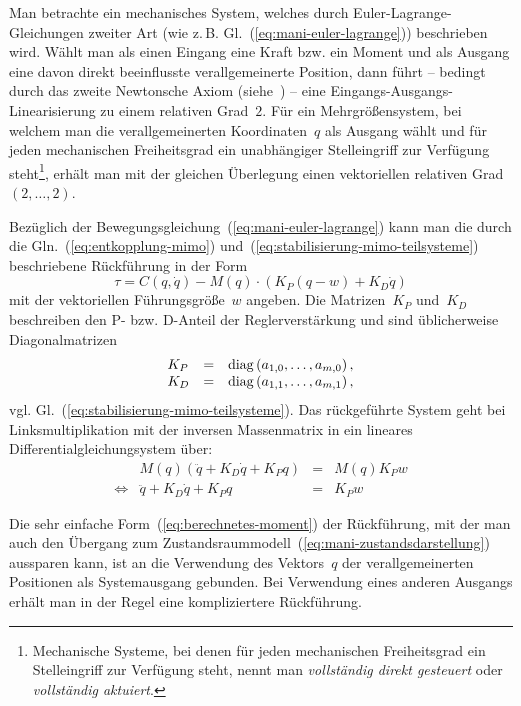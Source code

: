 \begin{remark}
\label{rem:Mechanisch-relativer-grad}Man betrachte ein mechanisches
System, welches durch Euler-Lagrange-Gleichungen zweiter Art (wie
z.\,B. Gl.~(\ref{eq:mani-euler-lagrange})) beschrieben wird. Wählt
man als einen Eingang eine Kraft bzw. ein Moment und als Ausgang eine
davon direkt beeinflusste verallgemeinerte Position, dann führt --
bedingt durch das zweite Newtonsche Axiom (siehe~\cite{nolting1})
-- eine Eingangs-Ausgangs-Linearisierung zu einem relativen Grad~$2$.
Für ein Mehr\-größen\-system, bei welchem man die verallgemeinerten
Koordinaten~$q$ als Ausgang wählt und für jeden mechanischen Freiheitsgrad
ein unabhängiger Stelleingriff zur Verfügung steht\footnote{Mechanische Systeme, bei denen für jeden mechanischen Freiheitsgrad
ein Stelleingriff zur Verfügung steht, nennt man \emph{vollständig
direkt gesteuert} oder \emph{vollständig aktuiert}.}, erhält man mit der gleichen Überlegung einen vektoriellen relativen
Grad $(2,\ldots,2)$. 

Bezüglich der Bewegungsgleichung~(\ref{eq:mani-euler-lagrange})
kann man die durch die Gln.~(\ref{eq:entkopplung-mimo}) und~(\ref{eq:stabilisierung-mimo-teilsysteme})
beschriebene Rückführung in der Form
\begin{equation}
\tau=C(q,\dot{q})-M(q)\cdot\left(K_{P}(q-w)+K_{D}\dot{q}\right)\label{eq:berechnetes-moment}
\end{equation}
mit der vektoriellen Führungsgröße~$w$ angeben. Die Matrizen~$K_{P}$
und~$K_{D}$ beschreiben den P- bzw. D-Anteil der Reglerverstärkung
und sind üblicherweise Diagonal\-matrizen
\[
\begin{array}{lcl}
K_{P} & = & {\operatorname{diag}}\left(a_{1,0},\ldots,a_{m,0}\right),\\
K_{D} & = & {\operatorname{diag}}\left(a_{1,1},\ldots,a_{m,1}\right),
\end{array}
\]
vgl. Gl.~(\ref{eq:stabilisierung-mimo-teilsysteme}). Das rückgeführte
System geht bei Linksmultiplikation mit der inversen Massenmatrix
in ein lineares Differentialgleichungsystem über:
\[
\begin{array}{lrcl}
 & M(q)\left(\ddot{q}+K_{D}\dot{q}+K_{P}q\right) & = & M(q)K_{P}w\\
\Longleftrightarrow & \ddot{q}+K_{D}\dot{q}+K_{P}q & = & K_{P}w
\end{array}
\]
\end{remark}
Die sehr einfache Form~(\ref{eq:berechnetes-moment}) der Rückführung,
mit der man auch den Übergang zum Zustandsraummodell~(\ref{eq:mani-zustandsdarstellung})
aussparen kann, ist an die Verwendung des Vektors~$q$ der verallgemeinerten
Positionen als Systemausgang gebunden. Bei Verwendung eines anderen
Ausgangs erhält man in der Regel eine kompliziertere Rückführung.

